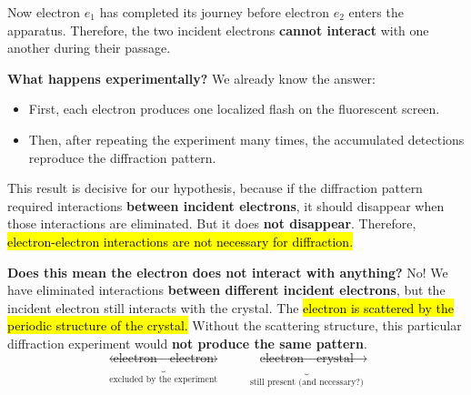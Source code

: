 \noindent
Now electron $e_1$ has completed its journey before electron $e_2$ enters the apparatus.
Therefore, the two incident electrons \textbf{cannot interact} with one another during their passage.

\highspace
\textcolor{Green3}{ \textbf{What happens experimentally?}} We already know the answer:
\begin{itemize}
    \item First, each electron produces one localized flash on the fluorescent screen.
    \item Then, after repeating the experiment many times, the accumulated detections reproduce the diffraction pattern.
\end{itemize}
This result is decisive for our hypothesis, because if the diffraction pattern required interactions \textbf{between incident electrons}, it should disappear when those interactions are eliminated. But it does \textbf{not disappear}. Therefore, \hl{electron-electron interactions are not necessary for diffraction.}

\highspace
\textcolor{Green3}{ \textbf{Does this mean the electron does not interact with anything?}} No! We have eliminated interactions \textbf{between different incident electrons}, but the incident electron still interacts with the crystal. The \hl{electron is scattered by the periodic structure of the crystal.} Without the scattering structure, this particular diffraction experiment would \textbf{not produce the same pattern}.
\begin{equation*}
    \underbrace{\text{electron}\leftrightarrow\text{electron}}_{\text{excluded by the experiment}}
    \qquad
    \underbrace{\text{electron}\leftrightarrow\text{crystal}}_{\text{still present (and necessary?)}}
\end{equation*}

